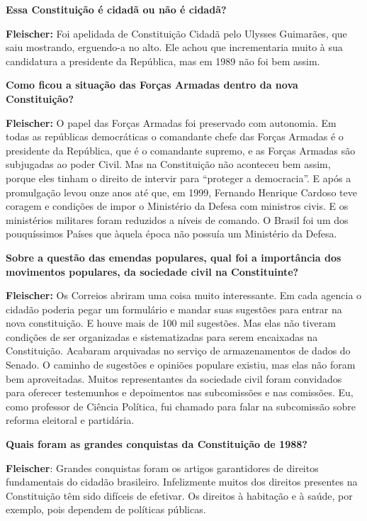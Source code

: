 \textbf{Essa Constituição é cidadã ou não é cidadã?}

\textbf{Fleischer:} Foi apelidada de Constituição Cidadã pelo Ulysses
Guimarães, que saiu mostrando, erguendo-a no alto. Ele achou que
incrementaria muito à sua candidatura a presidente da República, mas em
1989 não foi bem assim.

\textbf{Como ficou a situação das Forças Armadas dentro da nova
Constituição?}

\textbf{Fleischer:} O papel das Forças Armadas foi preservado com
autonomia. Em todas as repúblicas democráticas o comandante chefe das
Forças Armadas é o presidente da República, que é o comandante supremo,
e as Forças Armadas são subjugadas ao poder Civil. Mas na Constituição
não aconteceu bem assim, porque eles tinham o direito de intervir para
``proteger a democracia''. E após a promulgação levou onze anos até que,
em 1999, Fernando Henrique Cardoso teve coragem e condições de impor o
Ministério da Defesa com ministros civis. E os ministérios militares
foram reduzidos a níveis de comando. O Brasil foi um dos pouquíssimos
Países que àquela época não possuía um Ministério da Defesa.

\textbf{Sobre a questão das emendas populares, qual foi a importância
dos movimentos populares, da sociedade civil na Constituinte?}

\textbf{Fleischer:} Os Correios abriram uma coisa muito interessante. Em
cada agencia o cidadão poderia pegar um formulário e mandar suas
sugestões para entrar na nova constituição. E houve mais de 100 mil
sugestões. Mas elas não tiveram condições de ser organizadas e
sistematizadas para serem encaixadas na Constituição. Acabaram
arquivadas no serviço de armazenamentos de dados do Senado. O caminho de
sugestões e opiniões populare existiu, mas elas não foram bem
aproveitadas. Muitos representantes da sociedade civil foram convidados
para oferecer testemunhos e depoimentos nas subcomissões e nas
comissões. Eu, como professor de Ciência Política, fui chamado para
falar na subcomissão sobre reforma eleitoral e partidária.

\textbf{Quais foram as grandes conquistas da Constituição de 1988?}

\textbf{Fleischer}: Grandes conquistas foram os artigos garantidores de
direitos fundamentais do cidadão brasileiro. Infelizmente muitos dos
direitos presentes na Constituição têm sido difíceis de efetivar. Os
direitos à habitação e à saúde, por exemplo, pois dependem de políticas
públicas.

